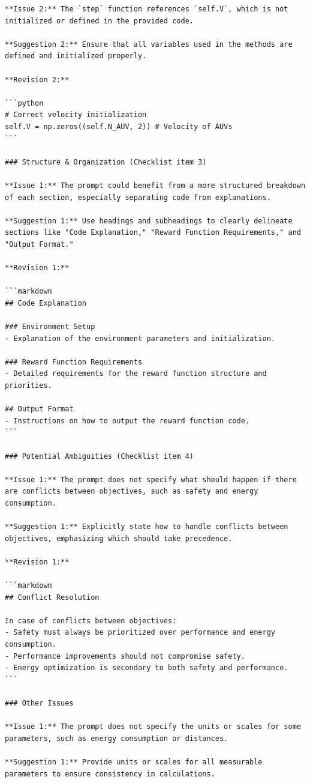 \documentclass{article}
\begin{document}
\begin{verbatim}
**Issue 2:** The `step` function references `self.V`, which is not initialized or defined in the provided code.

**Suggestion 2:** Ensure that all variables used in the methods are defined and initialized properly.

**Revision 2:** 

```python
# Correct velocity initialization
self.V = np.zeros((self.N_AUV, 2)) # Velocity of AUVs
```

### Structure & Organization (Checklist item 3)

**Issue 1:** The prompt could benefit from a more structured breakdown of each section, especially separating code from explanations.

**Suggestion 1:** Use headings and subheadings to clearly delineate sections like "Code Explanation," "Reward Function Requirements," and "Output Format."

**Revision 1:** 

```markdown
## Code Explanation

### Environment Setup
- Explanation of the environment parameters and initialization.

### Reward Function Requirements
- Detailed requirements for the reward function structure and priorities.

## Output Format
- Instructions on how to output the reward function code.
```

### Potential Ambiguities (Checklist item 4)

**Issue 1:** The prompt does not specify what should happen if there are conflicts between objectives, such as safety and energy consumption.

**Suggestion 1:** Explicitly state how to handle conflicts between objectives, emphasizing which should take precedence.

**Revision 1:** 

```markdown
## Conflict Resolution

In case of conflicts between objectives:
- Safety must always be prioritized over performance and energy consumption.
- Performance improvements should not compromise safety.
- Energy optimization is secondary to both safety and performance.
```

### Other Issues

**Issue 1:** The prompt does not specify the units or scales for some parameters, such as energy consumption or distances.

**Suggestion 1:** Provide units or scales for all measurable parameters to ensure consistency in calculations.


\end{verbatim}
\end{document}
